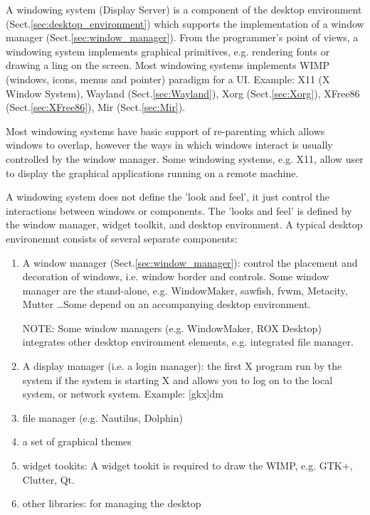   A windowing system (Display Server) is a component of the desktop environment
  (Sect.\ref{sec:desktop_environment}) which supports the implementation of a
  window manager (Sect.\ref{sec:window_manager}). 
  From the programmer's point of views, a windowing system implements graphical
  primitives, e.g. rendering fonts or drawing a ling on the screen.  
  Most windowing systems implements WIMP (windows, icons,
  menus and pointer) paradigm for a UI. Example: X11 (X Window System),
  Wayland (Sect.\ref{sec:Wayland}), Xorg (Sect.\ref{sec:Xorg}), XFree86
  (Sect.\ref{sec:XFree86}), Mir (Sect.\ref{sec:Mir}).
%   
   
  Most windowing systems have basic support of re-parenting which allows windows
  to overlap, however the ways in which windows interact is usually controlled
  by the window manager. Some windowing systems, e.g. X11, allow user to display
  the graphical applications running on a remote machine. 
  
  A windowing system does not define the 'look and feel', it just
  control the interactions between windows or components. The 'looks and feel'
  is defined by the window manager, widget toolkit, and desktop environment.
  A typical desktop environemnt consists of several separate components: 
\begin{enumerate}
%   
%   
  
  \item A window manager (Sect.\ref{sec:window_manager}): control the placement
  and decoration of windows, i.e. window border and controls. Some window
  manager are the stand-alone, e.g. WindowMaker, sawfish, fvwm, Metacity,
  Mutter \ldots Some depend on an accompanying desktop environment.
  
  NOTE: Some window managers (e.g. WindowMaker, ROX Desktop) integrates other
  desktop environment elements, e.g. integrated file manager.
  
  \item A display manager (i.e. a login manager): the first X program run by the
  system if the system is starting X and allows you to log on to the local
  system, or network system. Example: [gkx]dm
  
  \item file manager (e.g. Nautilus, Dolphin)
  
  \item a set of graphical themes
  
  \item widget tookits:   A widget tookit is required to draw the WIMP, e.g.  GTK+, Clutter, Qt.
   
  \item other libraries: for managing the desktop
\end{enumerate}

